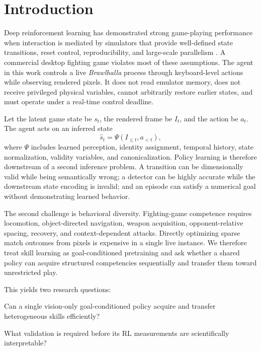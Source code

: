 \documentclass[11pt]{article}
\begin{document}
\section{Introduction}
Deep reinforcement learning has demonstrated strong game-playing performance when interaction is mediated by simulators that provide well-defined state transitions, reset control, reproducibility, and large-scale parallelism \citep{mnih2015dqn,vinyals2019alphastar}. A commercial desktop fighting game violates most of these assumptions. The agent in this work controls a live \emph{Brawlhalla} process through keyboard-level actions while observing rendered pixels. It does not read emulator memory, does not receive privileged physical variables, cannot arbitrarily restore earlier states, and must operate under a real-time control deadline.

Let the latent game state be $s_t$, the rendered frame be $I_t$, and the action be $a_t$. The agent acts on an inferred state
\begin{equation}
\hat{s}_t = \Psi(I_{\le t}, a_{<t}),
\end{equation}
where $\Psi$ includes learned perception, identity assignment, temporal history, state normalization, validity variables, and canonicalization. Policy learning is therefore downstream of a second inference problem. A transition can be dimensionally valid while being semantically wrong; a detector can be highly accurate while the downstream state encoding is invalid; and an episode can satisfy a numerical goal without demonstrating learned behavior.

The second challenge is behavioral diversity. Fighting-game competence requires locomotion, object-directed navigation, weapon acquisition, opponent-relative spacing, recovery, and context-dependent attacks. Directly optimizing sparse match outcomes from pixels is expensive in a single live instance. We therefore treat skill learning as goal-conditioned pretraining and ask whether a shared policy can acquire structured competencies sequentially and transfer them toward unrestricted play.

This yields two research questions:
\begin{description}[leftmargin=3.8em,style=nextline]
\item[\textbf{RQ1}] Can a single vision-only goal-conditioned policy acquire and transfer heterogeneous skills efficiently?
\item[\textbf{RQ2}] What validation is required before its RL measurements are scientifically interpretable?
\end{description}
\end{document}
